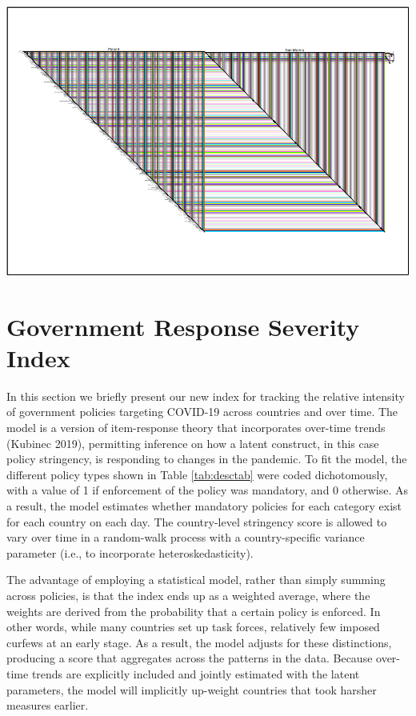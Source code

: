 \documentclass[]{article}
\begin{document}
\includegraphics{corona_wp_files/figure-latex/biofabric_europe-1.pdf}

\hypertarget{government-response-severity-index}{%
\section{Government Response Severity Index}\label{government-response-severity-index}}

In this section we briefly present our new index for tracking the relative intensity of government policies targeting COVID-19 across countries and over time. The model is a version of item-response theory that incorporates over-time trends (Kubinec 2019), permitting inference on how a latent construct, in this case policy stringency, is responding to changes in the pandemic. To fit the model, the different policy types shown in Table \ref{tab:desctab} were coded dichotomously, with a value of 1 if enforcement of the policy was mandatory, and 0 otherwise. As a result, the model estimates whether mandatory policies for each category exist for each country on each day. The country-level stringency score is allowed to vary over time in a random-walk process with a country-specific variance parameter (i.e., to incorporate heteroskedasticity).

The advantage of employing a statistical model, rather than simply summing across policies, is that the index ends up as a weighted average, where the weights are derived from the probability that a certain policy is enforced. In other words, while many countries set up task forces, relatively few imposed curfews at an early stage. As a result, the model adjusts for these distinctions, producing a score that aggregates across the patterns in the data. Because over-time trends are explicitly included and jointly estimated with the latent parameters, the model will implicitly up-weight countries that took harsher measures earlier.
\end{document}
